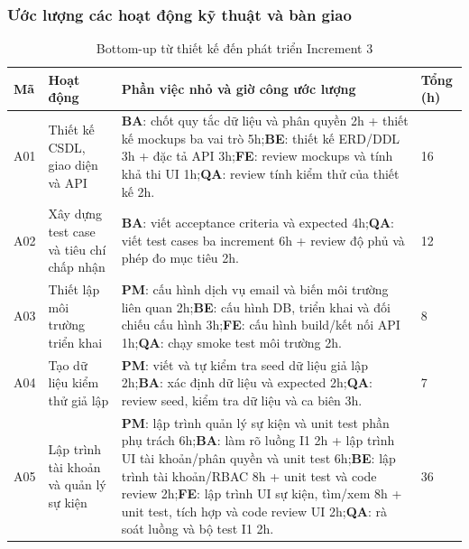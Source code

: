\subsubsection{Ước lượng các hoạt động kỹ thuật và bàn giao}
\begin{table}[H]
\centering
\caption{Bottom-up từ thiết kế đến phát triển Increment 3}
\footnotesize
\renewcommand{\arraystretch}{1.2}
\begin{tabularx}{\linewidth}{|p{0.8cm}|p{2.8cm}|>{\raggedright\arraybackslash}X|p{0.9cm}|}
\hline
\textbf{Mã} & \textbf{Hoạt động} & \textbf{Phần việc nhỏ và giờ công ước lượng} & \textbf{Tổng (h)} \\ \hline
A01 & Thiết kế CSDL, giao diện và API & \textbf{BA}: chốt quy tắc dữ liệu và phân quyền 2h + thiết kế mockups ba vai trò 5h;\newline \textbf{BE}: thiết kế ERD/DDL 3h + đặc tả API 3h;\newline \textbf{FE}: review mockups và tính khả thi UI 1h;\newline \textbf{QA}: review tính kiểm thử của thiết kế 2h. & 16 \\ \hline
A02 & Xây dựng test case và tiêu chí chấp nhận & \textbf{BA}: viết acceptance criteria và expected 4h;\newline \textbf{QA}: viết test cases ba increment 6h + review độ phủ và phép đo mục tiêu 2h. & 12 \\ \hline
A03 & Thiết lập môi trường triển khai & \textbf{PM}: cấu hình dịch vụ email và biến môi trường liên quan 2h;\newline \textbf{BE}: cấu hình DB, triển khai và đối chiếu cấu hình 3h;\newline \textbf{FE}: cấu hình build/kết nối API 1h;\newline \textbf{QA}: chạy smoke test môi trường 2h. & 8 \\ \hline
A04 & Tạo dữ liệu kiểm thử giả lập & \textbf{PM}: viết và tự kiểm tra seed dữ liệu giả lập 2h;\newline \textbf{BA}: xác định dữ liệu và expected 2h;\newline \textbf{QA}: review seed, kiểm tra dữ liệu và ca biên 3h. & 7 \\ \hline
A05 & Lập trình tài khoản và quản lý sự kiện & \textbf{PM}: lập trình quản lý sự kiện và unit test phần phụ trách 6h;\newline \textbf{BA}: làm rõ luồng I1 2h + lập trình UI tài khoản/phân quyền và unit test 6h;\newline \textbf{BE}: lập trình tài khoản/RBAC 8h + unit test và code review 2h;\newline \textbf{FE}: lập trình UI sự kiện, tìm/xem 8h + unit test, tích hợp và code review UI 2h;\newline \textbf{QA}: rà soát luồng và bộ test I1 2h. & 36 \\ \hline

\end{tabularx}
\end{table}
